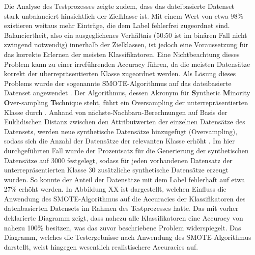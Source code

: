 Die Analyse des Testprozesses zeigte zudem, dass das dateibasierte Datenset stark unbalanciert hinsichtlich der Zielklasse ist. Mit einem Wert von etwa 98\% existieren weitaus mehr Einträge, die dem Label \glqq fehlerfrei\grqq{} zugeordnet sind. Balanciertheit, also ein ausgeglichenes Verhältnis (50:50 ist im binären Fall nicht zwingend notwendig) innerhalb der Zielklassen, ist jedoch eine Voraussetzung für das korrekte Erlernen der meisten Klassifikatoren. Eine Nichtbeachtung dieses Problem kann zu einer irreführenden Accuracy führen, da die meisten Datensätze korrekt der überrepräsentierten Klasse zugeordnet werden. Als Lösung dieses Problems wurde der sogenannte SMOTE-Algorithmus auf das dateibasierte Datenset angewendet \cite{Chawla2002}. Der Algorithmus, dessen Akronym für \textbf{S}ynthetic \textbf{M}inority \textbf{O}ver-sampling \textbf{Te}chnique steht, führt ein Oversampling der unterrepräsentierten Klasse durch \cite{Chawla2002}. Anhand von nächste-Nachbarn-Berechnungen auf Basis der Euklidischen Distanz zwischen den Attributwerten der einzelnen Datensätze des Datensets, werden neue synthetische Datensätze hinzugefügt (Oversampling), sodass sich die Anzahl der Datensätze der relevanten Klasse erhöht \cite{Chawla2002}. Im hier durchgeführten Fall wurde der Prozentsatz für die Generierung der synthetischen Datensätze auf 3000 festgelegt, sodass für jeden vorhandenen Datensatz der unterrepräsentierten Klasse 30 zusätzliche synthetische Datensätze erzeugt wurden. So konnte der Anteil der Datensätze mit dem Label \glqq fehlerhaft\grqq{} auf etwa 27\% erhöht werden. In Abbildung XX ist dargestellt, welchen Einfluss die Anwendung des SMOTE-Algorithmus auf die Accuracies der Klassifikatoren des datenbasierten Datensets im Rahmen des Testprozesses hatte. Das mit \glqq vorher\grqq{} deklarierte Diagramm zeigt, dass nahezu alle Klassifikatoren eine Accuracy von nahezu 100\% besitzen, was das zuvor beschriebene Problem widerspiegelt. Das Diagramm, welches die Testergebnisse nach Anwendung des SMOTE-Algorithmus darstellt, weist hingegen wesentlich realistischere Accuracies auf.


